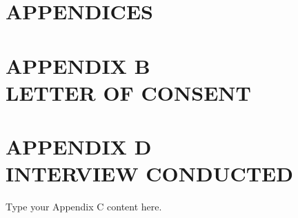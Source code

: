 \chapter*{APPENDICES}
{\baselineskip


	\chapter*{APPENDIX B \\ \normalfont LETTER OF CONSENT}
  


	\chapter*{APPENDIX D \\ \normalfont INTERVIEW CONDUCTED}
	Type your Appendix C content here.
}

